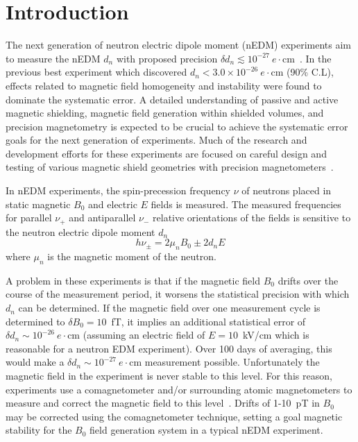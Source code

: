 \documentclass[review,number,sort&compress]{elsarticle}
\begin{document}
\linenumbers

\section{Introduction}

The next generation of neutron electric dipole moment (nEDM)
experiments aim to measure the nEDM $d_n$ with proposed precision
$\delta d_n\lesssim
10^{-27}~e\cdot$cm~\cite{bib:nedm2,bib:nedm2.5,bib:nedm3,bib:nedm3.5,bib:nedm5,bib:nedm6,bib:nedm6.5,bib:nedmtriumf}.
In the previous best experiment \cite{bib:baker,bib:pendlebury} which
discovered $d_n<3.0\times 10^{-26}~e\cdot$cm (90\% C.L), effects
related to magnetic field homogeneity and instability were found to
dominate the systematic error.  A detailed understanding of passive
and active magnetic shielding, magnetic field generation within
shielded volumes, and precision magnetometry is expected to be crucial
to achieve the systematic error goals for the next generation of
experiments.  Much of the research and development efforts for these
experiments are focused on careful design and testing of various
magnetic shield geometries with precision
magnetometers~\cite{bib:brys,bib:afach,bib:fierlingerroom,bib:sturmthesis,bib:patton}.

In nEDM experiments, the spin-precession frequency $\nu$ of neutrons
placed in static magnetic $B_0$ and electric $E$ fields is measured.
The measured frequencies for parallel $\nu_+$ and antiparallel $\nu_-$
relative orientations of the fields is sensitive to the neutron
electric dipole moment $d_n$
\begin{equation}
h\nu_\pm=2\mu_nB_0\pm 2d_nE
\end{equation}
where $\mu_n$ is the magnetic moment of the neutron.

A problem in these experiments is that if the magnetic field $B_0$
drifts over the course of the measurement period, it worsens the
statistical precision with which $d_n$ can be determined.  If the
magnetic field over one measurement cycle is determined to $\delta
B_0=10$~fT, it implies an additional statistical error of $\delta
d_n\sim 10^{-26}~e\cdot$cm (assuming an electric field of $E=10$~kV/cm
which is reasonable for a neutron EDM experiment).  Over 100 days of
averaging, this would make a $\delta d_n\sim 10^{-27}~e\cdot$cm
measurement possible.  Unfortunately the magnetic field in the
experiment is never stable to this level.  For this reason,
experiments use a comagnetometer and/or surrounding atomic
magnetometers to measure and correct the magnetic field to this
level~\cite{bib:baker,bib:brys,bib:afach}.  Drifts of 1-10~pT in $B_0$
may be corrected using the comagnetometer technique, setting a goal
magnetic stability for the $B_0$ field generation system in a typical
nEDM experiment.
\end{document}
